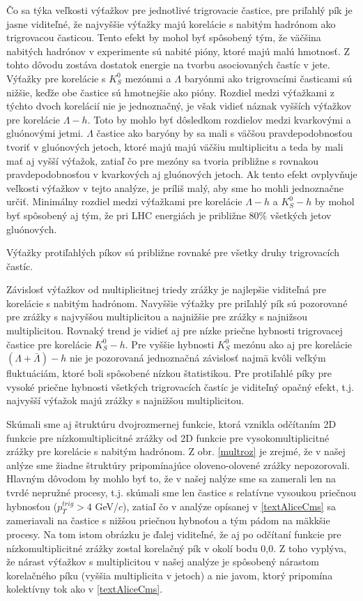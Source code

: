 \documentclass[thesismargins, thesislinespacing]{rnthesis}
\begin{document}
Čo sa týka veľkosti výťažkov pre jednotlivé trigrovacie častice, pre priľahlý pík je jasne viditeľné, že najvyššie výťažky majú korelácie s nabitým hadrónom ako trigrovacou časticou. Tento efekt by mohol byť spôsobený tým, že väčšina nabitých hadrónov v experimente sú nabité pióny, ktoré majú malú hmotnosť. Z tohto dôvodu zostáva dostatok energie na tvorbu asociovaných častíc v jete. Výťažky pre korelácie s $K^0_S$ mezónmi a $\Lambda$ baryónmi ako trigrovacími časticami sú nižšie, keďže obe častice sú hmotnejšie ako pióny. Rozdiel medzi výťažkami z týchto dvoch korelácií nie je jednoznačný, je však vidieť náznak vyšších výťažkov pre korelácie $\Lambda - h$. Toto by mohlo byť dôsledkom rozdielov medzi kvarkovými a gluónovými jetmi. $\Lambda$ častice ako baryóny by sa mali s väčšou pravdepodobnosťou tvoriť v gluónových jetoch, ktoré majú majú väčšiu multiplicitu a teda by mali mať aj vyšší výťažok, zatiaľ čo pre mezóny sa tvoria približne s rovnakou pravdepodobnosťou v kvarkových aj gluónových jetoch. Ak tento efekt ovplyvňuje veľkosti výťažkov v tejto analýze, je príliš malý, aby sme ho mohli jednoznačne určiť. Minimálny rozdiel medzi výťažkami pre korelácie  $\Lambda - h$ a $K^0_S-h$ by mohol byť spôsobený aj tým, že pri LHC energiách je približne 80\% všetkých jetov gluónových. 

Výťažky protiľahlých píkov sú približne rovnaké pre všetky druhy trigrovacích častíc.

Závislosť výťažkov od multiplicitnej triedy zrážky je najlepšie viditeľná pre korelácie s nabitým hadrónom. Navyššie výťažky pre priľahlý pík sú pozorované pre zrážky s najvyššou multiplicitou a najnižšie pre zrážky s najnižsou multiplicitou. Rovnaký trend je vidieť aj pre nízke priečne hybnosti trigrovacej častice pre korelácie  $K^0_S-h$. Pre vyššie hybnosti $K^{0}_{S}$ mezónu ako aj pre korelácie $(\Lambda+\bar{\Lambda}) -h$ nie je pozorovaná jednoznačná závislosť najmä kvôli veľkým fluktuáciám, ktoré boli spôsobené nízkou štatistikou. Pre protiľahlé píky pre vysoké priečne hybnosti všetkých trigrovacích častíc je viditeľný opačný efekt, t.j. najvyšší výťažok majú zrážky s najnižšou multiplicitou.  
  
Skúmali sme aj štruktúru dvojrozmernej funkcie, ktorá vznikla odčítaním 2D funkcie pre nízkomultiplicitné zrážky od 2D funk\-cie pre vysokomultiplicitné zrážky pre korelácie s nabitým hadrónom. Z obr. \ref{multroz} je zrejmé, že v našej anlýze sme žiadne štruktúry pripomínajúce oloveno-olovené zrážky nepozorovali. Hlavným dôvodom by mohlo byť to, že v našej nalýze sme sa zamerali len na tvrdé nepružné procesy, t.j. skúmali sme len častice s relatívne vysoukou priečnou hybnosťou ($p_{T}^{trig}>4$ GeV/$c$), zatiaľ čo v analýze opísanej v \ref{textAliceCms} sa zameriavali na častice s nižšou priečnou hybnoťou a tým pádom na mäkkšie procesy. 
Na tom istom obrázku je ďalej viditeľné, že aj po odčítaní funkcie pre nízkomultiplicitné zrážky zostal korelačný pík v okolí bodu 0,0. Z toho vyplýva, že nárast výťažkov s multiplicitou v našej analýze je spôsobený nárastom korelačného píku (vyššia multiplicita v jetoch) a nie javom, ktorý pripomína kolektívny tok ako v \ref{textAliceCms}.
\end{document}
